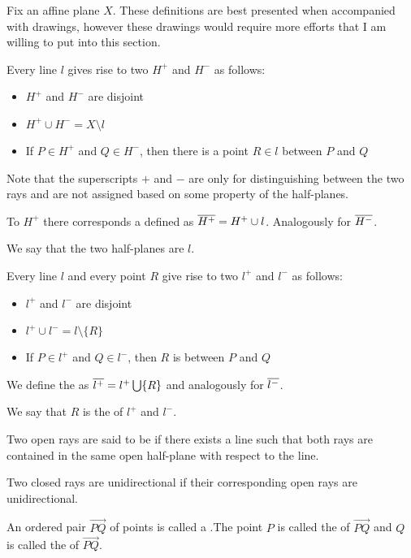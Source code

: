 \begin{definition}\label{def:affine_plane_definitions}
  Fix an affine plane \( X \). These definitions are best presented when accompanied with drawings, however these drawings would require more efforts that I am willing to put into this section.

  \begin{defenum}
     Every line \( l \) gives rise to two  \( H^+ \) and \( H^- \) as follows:
    \begin{itemize}
      \item \( H^+ \) and \( H^- \) are disjoint
      \item \( H^+ \cup H^- = X \setminus l \)
      \item If \( P \in H^+ \) and \( Q \in H^- \), then there is a point \( R \in l \) between \( P \) and \( Q \)
    \end{itemize}

    Note that the superscripts \( + \) and \( - \) are only for distinguishing between the two rays and are not assigned based on some property of the half-planes.

    To \( H^+ \) there corresponds a  defined as \( \overline{H^+} = H^+ \cup l \). Analogously for \( \overline{H^-} \).

    We say that the two half-planes are  \( l \).

     Every line \( l \) and every point \( R \) give rise to two  \( l^+ \) and \( l^- \) as follows:
    \begin{itemize}
      \item \( l^+ \) and \( l^- \) are disjoint
      \item \( l^+ \cup l^- = l \setminus \{ R \} \)
      \item If \( P \in l^+ \) and \( Q \in l^- \), then \( R \) is between \( P \) and \( Q \)
    \end{itemize}

    We define the  as \( \overline{l^+} = l^+ \bigcup \{ R \} \) and analogously for \( \overline{l^-} \).

    We say that \( R \) is the  of \( l^+ \) and \( l^- \).

     Two open rays are said to be  if there exists a line such that both rays are contained in the same open half-plane with respect to the line.

    Two closed rays are unidirectional if their corresponding open rays are unidirectional.

     An ordered pair \( \Vec{PQ} \) of points is called a .The point \( P \) is called the  of \( \Vec{PQ} \) and \( Q \) is called the  of \( \Vec{PQ} \).
  \end{defenum}
\end{definition}

